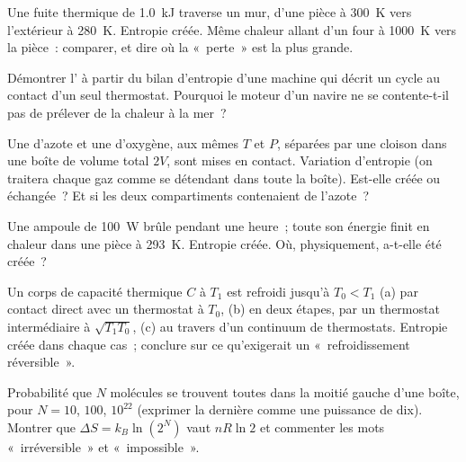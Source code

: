 \begin{exercise}[$\star\star$]\label{exo:b1:second-law-entropy:7}
Une fuite thermique de \qty{1.0}{kJ} traverse un mur, d'une pièce à
\qty{300}{K} vers l'extérieur à \qty{280}{K}. Entropie créée. Même chaleur
allant d'un four à \qty{1000}{K} vers la pièce~: comparer, et dire où la
«~perte~» est la plus grande.
\end{exercise}

\begin{exercise}[$\star\star$]\label{exo:b1:second-law-entropy:8}
Démontrer l' à partir du bilan d'entropie d'une machine qui
décrit un cycle au contact d'un seul thermostat. Pourquoi le moteur d'un
navire ne se contente-t-il pas de prélever de la chaleur à la mer~?
\end{exercise}

\begin{exercise}[$\star\star$]\label{exo:b1:second-law-entropy:9}
Une  d'azote et une  d'oxygène, aux mêmes $T$ et $P$, séparées par
une cloison dans une boîte de volume total $2V$, sont mises en contact. Variation
d'entropie (on traitera chaque gaz comme se détendant dans toute la boîte).
Est-elle créée ou échangée~? Et si les deux compartiments contenaient de l'azote~?
\end{exercise}

\begin{exercise}[$\star\star\star$]\label{exo:b1:second-law-entropy:10}
Une ampoule de \qty{100}{W} brûle pendant une heure~; toute son énergie finit
en chaleur dans une pièce à \qty{293}{K}. Entropie créée. Où, physiquement,
a-t-elle été créée~?
\end{exercise}

\begin{exercise}[$\star\star\star$]\label{exo:b1:second-law-entropy:11}
Un corps de capacité thermique $C$ à $T_1$ est refroidi jusqu'à $T_0 < T_1$
(a) par contact direct avec un thermostat à $T_0$, (b) en deux étapes, par un
thermostat intermédiaire à $\sqrt{T_1T_0}$, (c) au travers d'un continuum de
thermostats. Entropie créée dans chaque cas~; conclure sur ce qu'exigerait un
«~refroidissement réversible~».
\end{exercise}

\begin{exercise}[$\star\star\star$]\label{exo:b1:second-law-entropy:12}
Probabilité que $N$ molécules se trouvent toutes dans la moitié gauche d'une
boîte, pour $N = 10$, $100$, $10^{22}$ (exprimer la dernière comme une
puissance de dix). Montrer que $\Delta S = k_B\ln(2^N)$ vaut $nR\ln2$ et
commenter les mots «~irréversible~» et «~impossible~».
\end{exercise}

